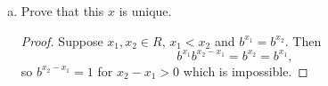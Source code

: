 \documentclass{article}
\begin{document}
\begin{enumerate}[(a)]
\begin{proof}
      On the other hand, suppose $b^x > y$. Then by (e), $b^{x-(1/n)} > y$ for
      sufficiently large $n$ and so so $x - (1/n)$ is an upper bound on $A$,
      contradicting that $x$ is the least upper bound on $A$.
    \end{proof}

  \item Prove that this $x$ is unique.
    \begin{proof}
      Suppose $x_1, x_2 \in R$, $x_1 < x_2$ and $b^{x_1} = b^{x_2}$. Then \[
        b^{x_1}b^{x_2-x_1} = b^{x_2} = b^{x_1},
      \] so $b^{x_2-x_1} = 1$ for $x_2 - x_1 > 0$ which is impossible.
    \end{proof}
\end{enumerate}
\end{document}
